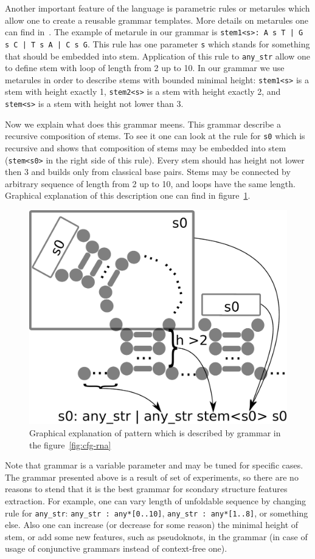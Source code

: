 \documentclass[a4paper,twoside]{article}
\begin{document}
Another important feature of the language is parametric rules or metarules which allow one to create a reusable grammar templates.
More details on metarules one can find in~\cite{!!!}.
The example of metarule in our grammar is \texttt{stem1<s>: A s T | G s C | T s A | C s G}.
This rule has one parameter \verb|s| which stands for something that should be embedded into stem.
Application of this rule to \verb|any_str| allow one to define stem with loop of length from 2 up to 10.
In our grammar we use metarules in order to describe stems with bounded minimal height: \verb|stem1<s>| is a stem with height exactly 1,  \verb|stem2<s>| is a stem with height exactly 2, and \verb|stem<s>| is a stem with height not lower than 3.

Now we explain what does this grammar meens.
This grammar describe a recursive composition of stems.
To see it one can look at the rule for \verb|s0| which is recursive and shows that composition of stems may be embedded into stem (\verb |stem<s0>| in the right side of this rule).
Every stem should has height not lower then 3 and builds only from classical base pairs.
Stems may be connected by arbitrary sequence of length from 2 up to 10, and loops have the same length.
Graphical explanation of this description one can find in figure~\ref{fig:cfg-rna-graphical}.

\begin{figure}
\centering
\includegraphics[width=.5\textwidth]{figures/16sgrammar.pdf}
\caption{Graphical explanation of pattern which is described by grammar in the figure~\ref{fig:cfg-rna}}
\label{fig:cfg-rna-graphical}
\end{figure}

Note that grammar is a variable parameter and may be tuned for specific cases.
The grammar presented above is a result of set of experiments, so there are no reasons to stend that it is the best grammar for scondary structure features extraction.
For example, one can vary length of unfoldable sequence by changing rule for \verb|any_str|: \verb|any_str : any*[0..10]|, \verb|any_str : any*[1..8]|, or something else.
Also one can increase (or decrease for some reason) the minimal height of stem, or add some new features, such as pseudoknots, in the grammar (in case of usage of conjunctive grammars instead of context-free one).
\end{document}
